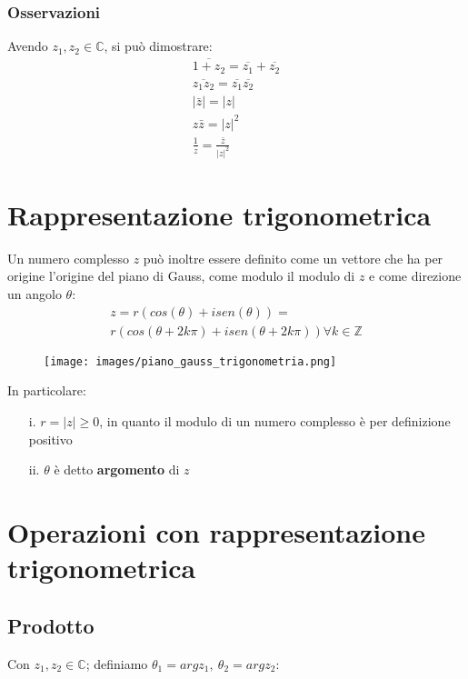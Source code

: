 \subsubsection{Osservazioni}
Avendo $z_1,z_2 \in \mathbb{C}$, si può dimostrare:\\
\begin{equation}
\begin{gathered}
\overline{1+z_2} = \overline{z_1}+\overline{z_2}\\
\overline{z_1z_2} = \overline{z_1}\overline{z_2}\\
|\bar{z}| = |z|\\
z\bar{z}=|z|^2\\
\frac{1}{z} = \frac{\bar{z}}{|z|^2}
\end{gathered}
\end{equation}

\section{Rappresentazione trigonometrica}
Un numero complesso $z$ può inoltre essere definito come un vettore che ha per origine l'origine del piano di Gauss, come modulo il modulo di $z$ e come direzione un angolo $\theta$:\\
\begin{equation}
\begin{gathered}
z=r(cos(\theta)+isen(\theta)) =\\
r(cos(\theta+2k\pi)+isen(\theta+2k\pi)) \forall k \in \mathbb{Z}
\end{gathered}
\end{equation}

\begin{figure}[htbp]
	\centering
	\texttt{[image: images/piano\_gauss\_trigonometria.png]}
\end{figure}

In particolare:
\begin{enumerate}
	\item [i.] $r = |z| \geq 0$, in quanto il modulo di un numero complesso è per definizione positivo
	\item [ii.] $\theta$ è detto \textbf{argomento} di $z$
\end{enumerate}

\section{Operazioni con rappresentazione trigonometrica}
\subsection{Prodotto}
Con $z_1,z_2 \in \mathbb{C}$; definiamo $\theta_1 = argz_1,\ \theta_2=argz_2$:

